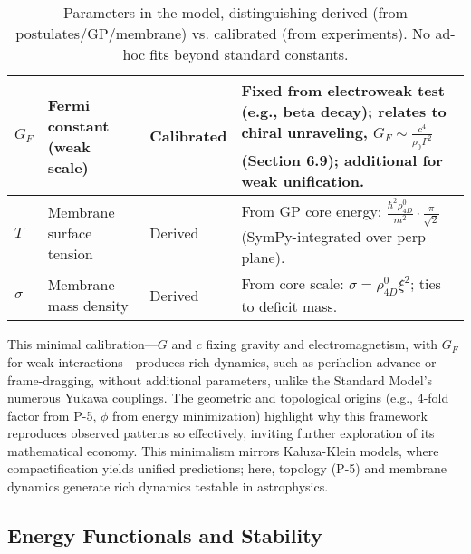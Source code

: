 \begin{table}[H]
\begin{tabularx}{\linewidth}{|p{1.5cm}|p{2cm}|l|Y|}
\hline
$G_F$ & Fermi constant (weak scale) & Calibrated & Fixed from electroweak test (e.g., beta decay); relates to chiral unraveling, $G_F \sim \frac{c^4}{\rho_0 \Gamma^2}$ (Section 6.9); additional for weak unification. \\
\hline
$T$ & Membrane surface tension & Derived & From GP core energy: $\frac{\hbar^2 \rho_{4D}^0}{m^2} \cdot \frac{\pi}{\sqrt{2}}$ (SymPy-integrated over perp plane). \\
\hline
$\sigma$ & Membrane mass density & Derived & From core scale: $\sigma = \rho_{4D}^0 \xi^2$; ties to deficit mass. \\
\hline
\end{tabularx}
\caption{Parameters in the model, distinguishing derived (from postulates/GP/membrane) vs. calibrated (from experiments). No ad-hoc fits beyond standard constants.}
\label{tab:parameters}
\end{table}

This minimal calibration---$G$ and $c$ fixing gravity and electromagnetism, with $G_F$ for weak interactions---produces rich dynamics, such as perihelion advance or frame-dragging, without additional parameters, unlike the Standard Model's numerous Yukawa couplings. The geometric and topological origins (e.g., 4-fold factor from P-5, $\phi$ from energy minimization) highlight why this framework reproduces observed patterns so effectively, inviting further exploration of its mathematical economy. This minimalism mirrors Kaluza-Klein models, where compactification yields unified predictions; here, topology (P-5) and membrane dynamics generate rich dynamics testable in astrophysics.

\medskip
\noindent
{}
\medskip

\subsection{Energy Functionals and Stability}

